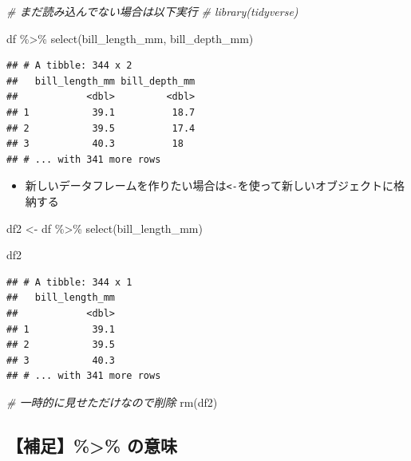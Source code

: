 \documentclass[
  xelatex,ja=standard, b5paper]{bxjsbook}
\newenvironment{Shaded}{\begin{snugshade}}{\end{snugshade}}
\newcommand{\CommentTok}[1]{\textcolor[rgb]{0.56,0.35,0.01}{\textit{#1}}}
\newcommand{\FunctionTok}[1]{\textcolor[rgb]{0.00,0.00,0.00}{#1}}
\newcommand{\NormalTok}[1]{#1}
\newcommand{\OtherTok}[1]{\textcolor[rgb]{0.56,0.35,0.01}{#1}}
\newcommand{\SpecialCharTok}[1]{\textcolor[rgb]{0.00,0.00,0.00}{#1}}
\providecommand{\tightlist}{%
  \setlength{\itemsep}{0pt}\setlength{\parskip}{0pt}}
\begin{document}
\begin{Shaded}
\begin{Highlighting}[]
\CommentTok{\# まだ読み込んでない場合は以下実行}
\CommentTok{\# library(tidyverse)}

\NormalTok{df }\SpecialCharTok{\%\textgreater{}\%} 
  \FunctionTok{select}\NormalTok{(bill\_length\_mm, bill\_depth\_mm)}
\end{Highlighting}
\end{Shaded}

\begin{verbatim}
## # A tibble: 344 x 2
##   bill_length_mm bill_depth_mm
##            <dbl>         <dbl>
## 1           39.1          18.7
## 2           39.5          17.4
## 3           40.3          18  
## # ... with 341 more rows
\end{verbatim}

\begin{itemize}
\tightlist
\item
  新しいデータフレームを作りたい場合は\texttt{\textless{}-}を使って新しいオブジェクトに格納する
\end{itemize}

\begin{Shaded}
\begin{Highlighting}[]
\NormalTok{df2 }\OtherTok{\textless{}{-}} 
\NormalTok{  df }\SpecialCharTok{\%\textgreater{}\%} \FunctionTok{select}\NormalTok{(bill\_length\_mm)}

\NormalTok{df2}
\end{Highlighting}
\end{Shaded}

\begin{verbatim}
## # A tibble: 344 x 1
##   bill_length_mm
##            <dbl>
## 1           39.1
## 2           39.5
## 3           40.3
## # ... with 341 more rows
\end{verbatim}

\begin{Shaded}
\begin{Highlighting}[]
\CommentTok{\# 一時的に見せただけなので削除}
\FunctionTok{rm}\NormalTok{(df2)}
\end{Highlighting}
\end{Shaded}

\hypertarget{select-standard-pipe}{%
\subsection{【補足】\%\textgreater\% の意味}\label{select-standard-pipe}}
\end{document}
